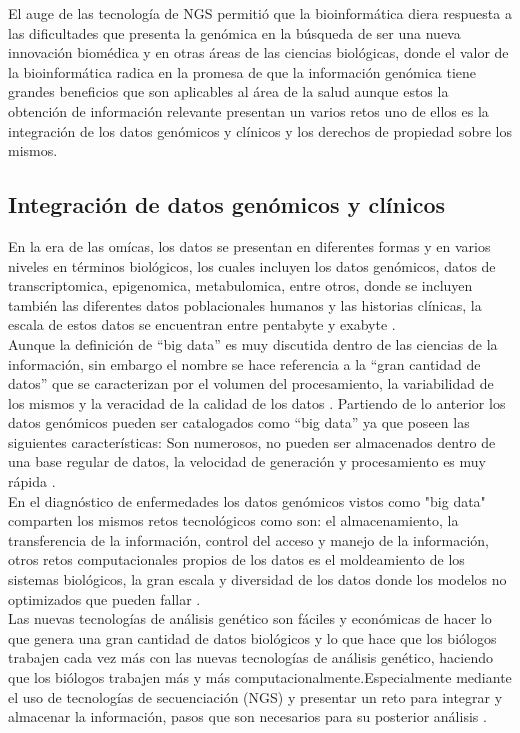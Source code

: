El auge de las tecnología de NGS permitió que la bioinformática diera respuesta a las dificultades que presenta la genómica en la búsqueda de ser una nueva innovación biomédica y en otras áreas de las ciencias biológicas, donde el valor de la bioinformática radica en la promesa de que la información genómica tiene grandes beneficios que son aplicables al área de la salud aunque estos la obtención de información relevante presentan un varios retos uno de ellos es la integración de los datos genómicos y clínicos y los derechos de propiedad sobre los mismos\cite{Searls2010}. 

\subsection{Integración de datos genómicos y clínicos}

En la era de las omícas, los datos se presentan en diferentes formas y en varios niveles en términos biológicos, los cuales incluyen los datos genómicos, datos de transcriptomica, epigenomica, metabulomica, entre otros, donde se incluyen también las diferentes datos poblacionales humanos y las historias clínicas, la escala de estos datos se encuentran  entre  pentabyte y exabyte \cite{Li2014}.\\

Aunque la definición de “big data” es muy discutida dentro de las ciencias de la información, sin embargo el nombre se hace referencia a la “gran cantidad de datos” que se caracterizan por el volumen del procesamiento, la variabilidad de los mismos y la veracidad de la calidad de los datos \cite{Li2014}. Partiendo de lo anterior los datos genómicos  pueden ser catalogados como “big data” ya que poseen las siguientes características: Son numerosos, no pueden ser almacenados dentro de una base regular de datos, la velocidad  de generación y procesamiento es muy rápida \cite{Hashem2015}. \\

En el diagnóstico de enfermedades los datos genómicos vistos como "big data" comparten los mismos retos tecnológicos como son: el almacenamiento, la transferencia de la información, control del acceso y manejo de la información, otros retos computacionales propios de los datos es el moldeamiento de los sistemas biológicos, la gran escala y diversidad de los datos donde los modelos no optimizados que pueden fallar \cite{Ren2015}. \\

Las nuevas tecnologías de análisis genético son fáciles y económicas de hacer lo que genera una gran cantidad de datos biológicos y lo que hace que los biólogos trabajen cada vez más con las nuevas tecnologías de análisis genético, haciendo que los biólogos trabajen más y más computacionalmente.Especialmente mediante el uso de  tecnologías de secuenciación (NGS) y presentar un reto para integrar y almacenar la información, pasos que son necesarios para su posterior análisis \cite{Li2014,Cook2016}.\\

